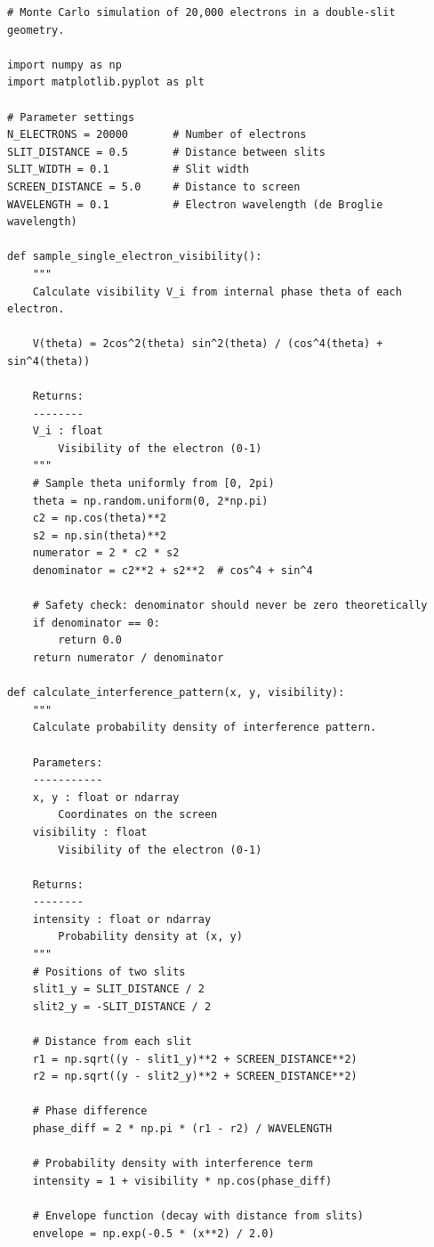\documentclass[%
 reprint,
 amsmath,amssymb,
 aps,
 prb,
]{revtex4-2}
\numberwithin{equation}{section}
\begin{document}
\begin{lstlisting}[caption={Monte Carlo simulation for ensemble-averaged visibility},label={lst:monte_carlo}]
# Monte Carlo simulation of 20,000 electrons in a double-slit geometry.

import numpy as np
import matplotlib.pyplot as plt

# Parameter settings
N_ELECTRONS = 20000       # Number of electrons
SLIT_DISTANCE = 0.5       # Distance between slits
SLIT_WIDTH = 0.1          # Slit width
SCREEN_DISTANCE = 5.0     # Distance to screen
WAVELENGTH = 0.1          # Electron wavelength (de Broglie wavelength)

def sample_single_electron_visibility():
    """
    Calculate visibility V_i from internal phase theta of each electron.
    
    V(theta) = 2cos^2(theta) sin^2(theta) / (cos^4(theta) + sin^4(theta))
    
    Returns:
    --------
    V_i : float
        Visibility of the electron (0-1)
    """
    # Sample theta uniformly from [0, 2pi)
    theta = np.random.uniform(0, 2*np.pi)
    c2 = np.cos(theta)**2
    s2 = np.sin(theta)**2
    numerator = 2 * c2 * s2
    denominator = c2**2 + s2**2  # cos^4 + sin^4
    
    # Safety check: denominator should never be zero theoretically
    if denominator == 0:
        return 0.0
    return numerator / denominator

def calculate_interference_pattern(x, y, visibility):
    """
    Calculate probability density of interference pattern.
    
    Parameters:
    -----------
    x, y : float or ndarray
        Coordinates on the screen
    visibility : float
        Visibility of the electron (0-1)
    
    Returns:
    --------
    intensity : float or ndarray
        Probability density at (x, y)
    """
    # Positions of two slits
    slit1_y = SLIT_DISTANCE / 2
    slit2_y = -SLIT_DISTANCE / 2
    
    # Distance from each slit
    r1 = np.sqrt((y - slit1_y)**2 + SCREEN_DISTANCE**2)
    r2 = np.sqrt((y - slit2_y)**2 + SCREEN_DISTANCE**2)
    
    # Phase difference
    phase_diff = 2 * np.pi * (r1 - r2) / WAVELENGTH
    
    # Probability density with interference term
    intensity = 1 + visibility * np.cos(phase_diff)
    
    # Envelope function (decay with distance from slits)
    envelope = np.exp(-0.5 * (x**2) / 2.0)
    

\end{lstlisting}
\end{document}
